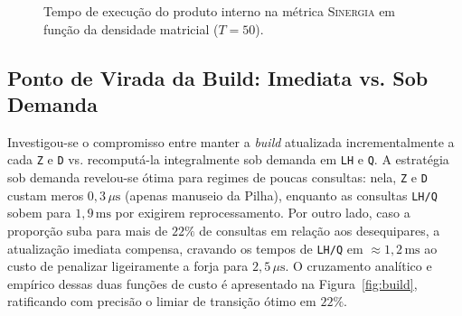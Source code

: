 \documentclass[letterpaper]{article}
\begin{document}
\begin{figure}[t]
\centering
{}
\caption{Tempo de execução do produto interno na métrica \textsc{Sinergia} em função da densidade matricial ($T=50$).}
\label{fig:densidade}
\end{figure}

\subsection{Ponto de Virada da Build: Imediata vs. Sob Demanda}
Investigou-se o compromisso entre manter a \textit{build} atualizada incrementalmente a cada \texttt{Z} e \texttt{D} vs. recomputá-la integralmente sob demanda em \texttt{LH} e \texttt{Q}. A estratégia sob demanda revelou-se ótima para regimes de poucas consultas: nela, \texttt{Z} e \texttt{D} custam meros $0{,}3\,\mu\text{s}$ (apenas manuseio da Pilha), enquanto as consultas \texttt{LH/Q} sobem para $1{,}9\,\text{ms}$ por exigirem reprocessamento. Por outro lado, caso a proporção suba para mais de $22\%$ de consultas em relação aos desequipares, a atualização imediata compensa, cravando os tempos de \texttt{LH/Q} em $\approx 1{,}2\,\text{ms}$ ao custo de penalizar ligeiramente a forja para $2{,}5\,\mu\text{s}$. O cruzamento analítico e empírico dessas duas funções de custo é apresentado na Figura~\ref{fig:build}, ratificando com precisão o limiar de transição ótimo em $22\%$.
\end{document}
